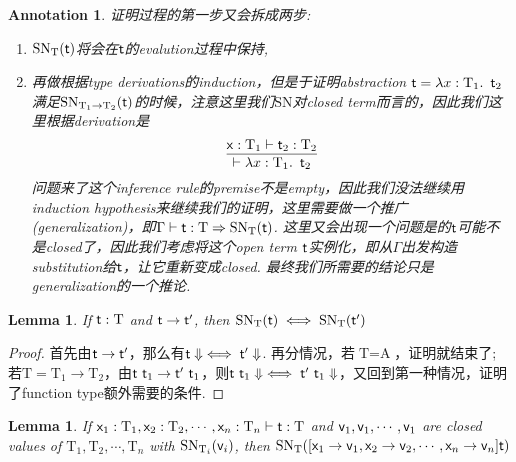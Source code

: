 \documentclass{article}
\theoremstyle{plain}
\newtheorem{lemma}[theorem]{Lemma}
\newtheorem{annotation}[theorem]{Annotation}
\theoremstyle{nonumberplain}
\newtheorem{proof}{Proof}
\newcommand{\lam}[2]{\ensuremath{\lambda #1\ldotp~ #2}} %
\newcommand{\singletype}[1]{\text{#1}}
\newcommand{\termtype}[2]{\ensuremath{#1:#2}}
\newcommand{\term}[1]{\ensuremath\mathsf{#1}}
\begin{document}
\begin{annotation}
\rm 证明过程的第一步又会拆成两步:
\begin{enumerate}
	\item $\text{SN}_\singletype{T}(\term{t})$将会在$\term{t}$的evalution过程中保持,
	\item 再做根据type derivations的induction，但是于证明abstraction $\term{t}=\lam{\termtype{x}{\singletype{T}_1}}{\term{t}_2}$满足$\text{SN}_{\singletype{T}_1 \to \singletype{T}_2}(\term{t})$的时候，注意这里我们$\text{SN}$对closed term而言的，因此我们这里根据derivation是
	$$
	\infer{\vdash \lam{\termtype{x}{\singletype{T}_1}}{\term{t}_2}}{\termtype{\term{x}}{\singletype{T}_1} \vdash \termtype{\term{t}_2}{\singletype{T}_2}}
	$$
	问题来了这个inference rule的premise不是empty，因此我们没法继续用induction hypothesis来继续我们的证明，这里需要做一个推广(generalization)，即$\Gamma	\vdash \termtype{\term{t}}{\singletype{T}} \Rightarrow \text{SN}_\singletype{T}(\term{t})$.  这里又会出现一个问题是的$\term{t}$可能不是closed了，因此我们考虑将这个open term $\term{t}$实例化，即从$\Gamma$出发构造substitution给$\term{t}$，让它重新变成closed. 最终我们所需要的结论只是generalization的一个推论.
\end{enumerate}
\end{annotation}

\begin{lemma}\label{logical predicate preserved under evalutaion}
\rm If $\termtype{\term{t}}{\singletype{T}}$ and $\term{t} \to \term{t}'$, then $\text{SN}_{\singletype{T}}(\term{t}) \iff \text{SN}_{\singletype{T}}(\term{t}')$ 
\end{lemma}

\begin{proof}
首先由$\term{t} \to \term{t}'$，那么有$\term{t}\Downarrow \iff \term{t}'\Downarrow$. 再分情况，若$\singletype{T} = \singletype{A}$，证明就结束了; 若$\singletype{T} = \singletype{T}_1 \to \singletype{T}_2$，由$\term{t}~\term{t}_1 \to \term{t'}~\term{t}_1 $，则$\term{t}~\term{t}_1\Downarrow \iff \term{t}'~\term{t}_1\Downarrow$，又回到第一种情况，证明了function type额外需要的条件. 
\end{proof}

\begin{lemma}\label{logical predicate under substitution}
\rm If $\termtype{\term{x}_1}{\singletype{T}_1},\termtype{\term{x}_2}{\singletype{T}_2},\cdots,\termtype{\term{x}_n}{\singletype{T}_n} \vdash \termtype{\term{t}}{\singletype{T}}$ and $\term{v}_1,\term{v}_1,\cdots,\term{v}_1$ are closed values of $\singletype{T}_1,\singletype{T}_2,\cdots,\singletype{T}_n$ with $\text{SN}_{\singletype{T}_i}(\term{v}_i)$, then $\text{SN}_{\singletype{T}}([\term{x}_1 \to \term{v}_1,\term{x}_2 \to \term{v}_2,\cdots,\term{x}_n \to \term{v}_n]\term{t})$
\end{lemma}
\end{document}
